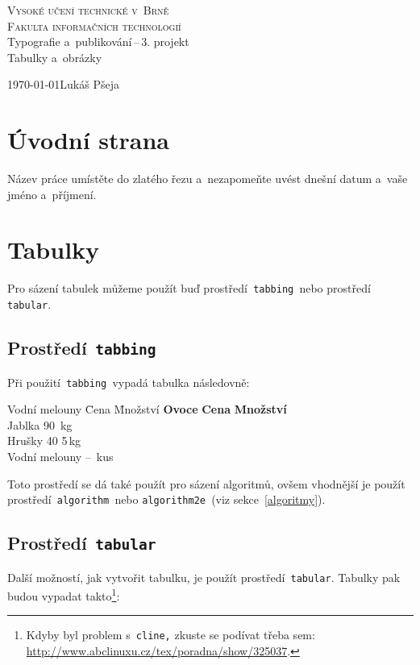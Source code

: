 \documentclass[a4paper, 11pt]{article}
\begin{document}
\begin{titlepage}
    \begin{center}
        \textsc{\Huge Vysoké učení technické v~Brně}\\
        \medskip
        \textsc{\huge Fakulta informačních technologií}\\
        \bigskip
        {\LARGE Typografie a~publikování\,--\,3. projekt}\\
        \medskip
        {\Huge Tabulky a~obrázky}
    \end{center}
    {\Large \today \hfill Lukáš Pšeja}\\\null
\end{titlepage}

\section{Úvodní strana}
    Název práce umístěte do zlatého řezu a~nezapomeňte uvést dnešní datum a~vaše jméno a~příjmení.

\section{Tabulky}
    Pro sázení tabulek můžeme použít buď prostředí\texttt{ tabbing }nebo prostředí\texttt{ tabular}.

    \subsection{Prostředí\texttt{ tabbing}}
        Při použití\texttt{ tabbing }vypadá tabulka následovně:
        \begin{tabbing}
            Vodní melouny \quad \= Cena \quad \= Množství \kill
            \textbf{Ovoce} \> \textbf{Cena} \> \textbf{Množství} \\
            Jablka 90 \,kg \\
            Hrušky 40 5\,kg \\
            Vodní melouny -- \,kus \\
        \end{tabbing}
        Toto prostředí se dá také použít pro sázení algoritmů, ovšem vhodnější je použít prostředí\texttt{ algorithm }nebo \texttt{algorithm2e }(viz sekce~\ref{algoritmy}).

    \subsection{Prostředí\texttt{ tabular}}
        Další možností, jak vytvořit tabulku, je použít prostředí\texttt{ tabular}. Tabulky pak budou vypadat takto\footnote{Kdyby byl problem s\texttt{ cline,} zkuste se podívat třeba sem: \href{http://www.abclinuxu.cz/tex/poradna/show/325037}{http://www.abclinuxu.cz/tex/poradna/show/325037}.}:
        \bigskip
\end{document}
